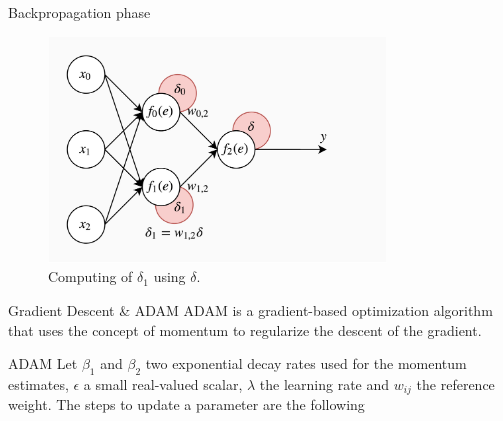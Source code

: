 \documentclass[xcolor={usenames}]{beamer}
\begin{document}
  \begin{frame}{Backpropagation phase}
  	\begin{figure}
  		\centering
  		\includegraphics[width=0.8\textwidth]{../figures/backward-propagation-2.png}
  		\caption{Computing of $\delta_1$ using $\delta$.}
  	\end{figure}
  \end{frame}
  \begin{frame}{Gradient Descent \& ADAM}
  	ADAM is a gradient-based optimization algorithm that uses the concept of momentum to regularize the descent of the gradient.
  \end{frame}
  \begin{frame}{ADAM}
  	Let $\beta_1$ and $\beta_2$ two exponential decay rates used for the momentum estimates, $\epsilon$ a small real-valued scalar, $\lambda$ the learning rate and $w_{ij}$ the reference weight. The steps to update a parameter are the following
  	\begin{itemize}
  	\end{itemize}
  \end{frame}
\end{document}
